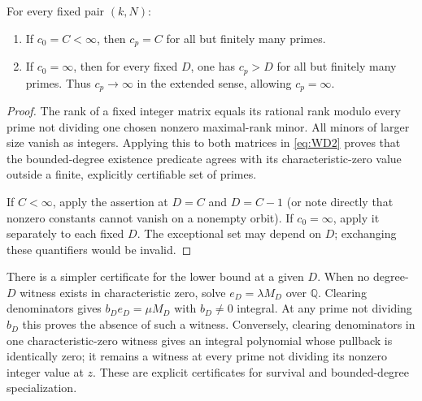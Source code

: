 \begin{samepage}
\begin{theorem}
For every fixed pair $(k,N)$:
\begin{enumerate}
\item If $c_0=C<\infty$, then $c_p=C$ for all but finitely many primes.
\item If $c_0=\infty$, then for every fixed $D$, one has $c_p>D$
for all but finitely many primes.  Thus $c_p\to\infty$ in the
extended sense, allowing $c_p=\infty$.
\end{enumerate}
\end{theorem}
\end{samepage}
\begin{proof}
The rank of a fixed integer matrix equals its rational rank modulo
every prime not dividing one chosen nonzero maximal-rank minor.
All minors of larger size vanish as integers.  Applying this to both
matrices in \eqref{eq:WD2} proves that the bounded-degree existence predicate
agrees with its characteristic-zero value outside a finite, explicitly
certifiable set of primes.

If $C<\infty$, apply the assertion at $D=C$ and $D=C-1$ (or note
directly that nonzero constants cannot vanish on a nonempty orbit).
If $c_0=\infty$, apply it separately to each fixed $D$.  The exceptional
set may depend on $D$; exchanging these quantifiers would be invalid.
\end{proof}

There is a simpler certificate for the lower bound at a given $D$.
When no degree-$D$ witness exists in characteristic zero, solve
$e_D=\lambda M_D$ over $\mathbb Q$.  Clearing denominators gives
$b_De_D=\mu M_D$ with $b_D\ne0$ integral.  At any prime not dividing
$b_D$ this proves the absence of such a witness.  Conversely, clearing
denominators in one characteristic-zero witness gives an integral
polynomial whose pullback is identically zero; it remains a witness at
every prime not dividing its nonzero integer value at $z$.  These are explicit certificates for survival and bounded-degree specialization.

